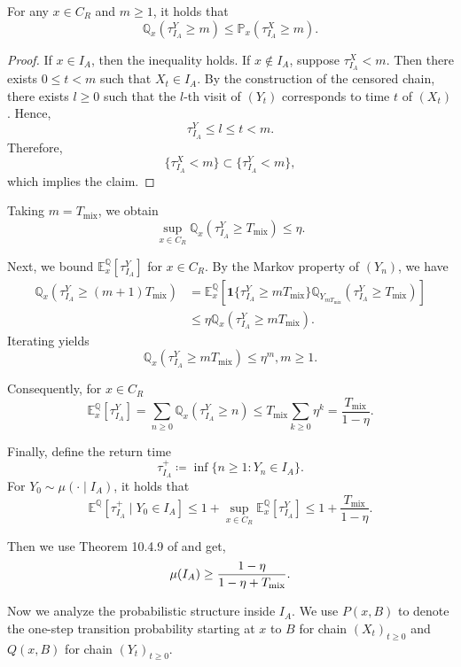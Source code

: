 \documentclass{article}
\begin{document}
\begin{claim}
For any $x\in C_R$ and $m\ge1$, it holds that
\[
\mathbb Q_x(\tau_{I_A}^Y \ge m)
\le
\mathbb P_x(\tau_{I_A}^X \ge m).
\]
\end{claim}

\begin{proof}
If $x\in I_A$, then the inequality holds. If $x\notin I_A$, suppose $\tau_{I_A}^X < m$. Then there exists $0\le t<m$ such that
$X_t\in I_A$. By the construction of the censored chain, there exists
$l\ge0$ such that the $l$-th visit of $(Y_t)$ corresponds to time $t$ of
$(X_t)$. Hence,
\[
\tau_{I_A}^Y \le l \le t < m.
\]
Therefore,
\[
\{\tau_{I_A}^X < m\} \subset \{\tau_{I_A}^Y < m\},
\]
which implies the claim.
\end{proof}

Taking $m=T_{\mathrm{mix}}$, we obtain
\[
\sup_{x\in C_R}
\mathbb Q_x(\tau_{I_A}^Y \ge T_{\mathrm{mix}})
\le \eta.
\]

Next, we bound $\mathbb E_x^{\mathbb Q}[\tau_{I_A}^Y]$ for $x\in C_R$.
By the Markov property of $(Y_n)$, we have
\begin{align*}
\mathbb Q_x(\tau_{I_A}^Y \ge (m+1)T_{\mathrm{mix}})
&=
\mathbb E_x^{\mathbb Q}\left[
\mathbf 1\{\tau_{I_A}^Y \ge mT_{\mathrm{mix}}\}
\mathbb Q_{Y_{mT_{\mathrm{mix}}}}
(\tau_{I_A}^Y \ge T_{\mathrm{mix}})
\right] \\
&\le
\eta\mathbb Q_x(\tau_{I_A}^Y \ge mT_{\mathrm{mix}}).
\end{align*}
Iterating yields
\[
\mathbb Q_x(\tau_{I_A}^Y \ge mT_{\mathrm{mix}})
\le \eta^m,m\ge1.
\]

Consequently, for $x\in C_R$
\[
\mathbb E^{\mathbb Q}_x[\tau_{I_A}^Y]
=
\sum_{n\ge0}\mathbb Q_x(\tau_{I_A}^Y \ge n)
\le
T_{\mathrm{mix}}\sum_{k\ge0}\eta^k
=
\frac{T_{\mathrm{mix}}}{1-\eta}.
\]

Finally, define the return time
\[
\tau_{I_A}^+ \coloneqq  \inf\{n\ge1: Y_n\in I_A\}.
\]
For $Y_0\sim \mu(\cdot\mid I_A)$, it holds that
\[
\mathbb E^{\mathbb Q}[\tau_{I_A}^+ \mid Y_0\in I_A]
\le
1 + \sup_{x\in C_R}\mathbb E^{\mathbb Q}_x[\tau_{I_A}^Y]
\le
1 + \frac{T_{\mathrm{mix}}}{1-\eta}.
\]

Then we use Theorem 10.4.9 of \citep{meyn2012markov}  and get,
\begin{equation*}
    \mu(I_A)\geq \frac{1-\eta}{1-\eta+T_{\textnormal{mix}}}.
\end{equation*}

Now we analyze the probabilistic structure inside $I_A$. We use $P(x, B)$ to denote the one-step transition probability starting at $x$ to $B$ for chain $(X_t)_{t\geq0}$ and $Q(x, B)$ for chain $(Y_t)_{t\geq 0}$.
\end{document}
